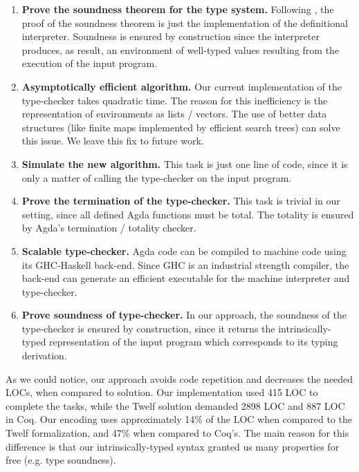 \documentclass[sigconf]{acmart}
\theoremstyle{definition}
\begin{document}
\begin{enumerate}
  \item \textbf{Prove the soundness theorem for the type system.} Following \citet{Amin17}, the proof of the soundness
        theorem is just the implementation of the definitional interpreter. Soundness is ensured by construction since the interpreter
        produces, as result, an environment of well-typed values resulting from the execution of the input program.
  \item \textbf{Asymptotically efficient algorithm.} Our current implementation of the type-checker takes quadratic time. The reason
        for this inefficiency is the representation of environments as lists / vectors. The use of better data structures (like finite
        maps implemented by efficient search trees) can solve this issue. We leave this fix to future work.
  \item \textbf{Simulate the new algorithm.} This task is just one line of code, since it is only a matter of calling the type-checker
        on the input program.
  \item \textbf{Prove the termination of the type-checker.} This task is trivial in our setting, since all defined Agda functions
        must be total. The totality is ensured by Agda's termination / totality checker.
  \item \textbf{Scalable type-checker.} Agda code can be compiled to machine code using its GHC-Haskell back-end. Since GHC is
        an industrial strength compiler, the back-end can generate an efficient executable for the machine interpreter and type-checker. 
  \item \textbf{Prove soundness of type-checker.} In our approach, the soundness of the type-checker is ensured by construction,
        since it returns the intrinsically-typed representation of the input program which corresponds to its typing derivation.
\end{enumerate}

As we could notice, our approach avoids code repetition and decreases the needed LOCs, when compared to \citet{Appel07} solution.
Our implementation used 415 LOC to complete the tasks, while the Twelf solution demanded 2898 LOC and 887 LOC in Coq.
Our encoding uses approximately 14\% of the LOC when compared to the Twelf formalization, and 47\% when compared to Coq's. The main
reason for this difference is that our intrinsically-typed syntax granted us many properties for free (e.g. type soundness).

\end{document}
